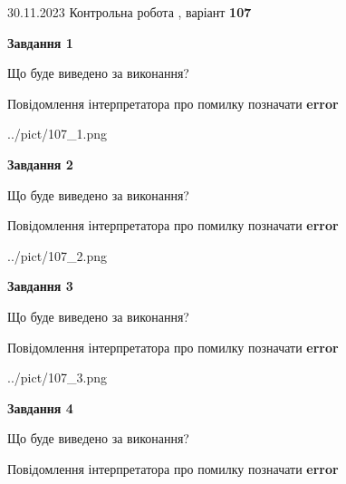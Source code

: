 \documentclass[12pt, ukrainian]{article}
\begin{document}
{{30.11.2023 Контрольна робота , варіант  \No \textbf { 107 }\par}}
{




{\begin {center}\textbf{Завдання 1}\end {center}}\par
Що буде виведено за виконання? \par
Повідомлення інтерпретатора про помилку позначати \textbf{error}

\begin{center}
	{../pict/107_1.png}
\end{center}
\newpage

{\begin {center}\textbf{Завдання 2}\end {center}}\par
Що буде виведено за виконання? \par
Повідомлення інтерпретатора про помилку позначати \textbf{error}

\begin{center}
	{../pict/107_2.png}
\end{center}
\newpage

{\begin {center}\textbf{Завдання 3}\end {center}}\par
Що буде виведено за виконання? \par
Повідомлення інтерпретатора про помилку позначати \textbf{error}

\begin{center}
	{../pict/107_3.png}
\end{center}
\newpage

{\begin {center}\textbf{Завдання 4}\end {center}}\par
Що буде виведено за виконання? \par
Повідомлення інтерпретатора про помилку позначати \textbf{error}

}
\end{document}
